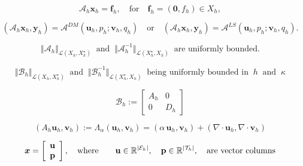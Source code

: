 \documentclass[11pt]{article}
\begin{document}
\begin{equation}\label{mixed-operator}
 \mathcal{A}_h {\bm x}_h = {\bm f}_h, \quad \mbox{for} \quad
{\bm f}_h =({\bm 0}, f_h) \in X_h,
\end{equation}

$$
( \mathcal{A}_h {\bm x}_h, {\bm y}_h) = {{\mathcal A}}^{DM}({{\mathbf u}}_h,p_h; {{\mathbf v}}_h,q_h)
\quad
\mbox{or} \quad
 ( \mathcal{A}_h {\bm x}_h, {\bm y}_h) = {{\mathcal A}}^{LS}({{\mathbf u}}_h,p_h; {{\mathbf v}}_h,q_h).
$$

\begin{equation}\label{eq:operator_norms}
 \Vert\mathcal{A}_h\Vert_{\mathcal{L}(X_h,X_h^{\star})}\;\; \mbox{and}\;\; 
\Vert\mathcal{A}_h^{-1}\Vert_{\mathcal{L}(X_h^{\star},X_h)} \;\; \mbox{are uniformly bounded}. 
\end{equation}

\begin{equation}\label{eq:precond_norms}
 \Vert\mathcal{B}_h\Vert_{\mathcal{L}(X_h,X_h^{\star})}\;\; \mbox{and}\;\; 
\Vert\mathcal{B}_h^{-1}\Vert_{\mathcal{L}(X_h^{\star},X_h)} \;\; \mbox{being uniformly bounded in} \;\; h \;\; \mbox{and} 
\;\; \kappa
\end{equation}

\begin{equation}\label{eq:AFW_preconditioner}
 \mathcal{B}_h:=\left[
\begin{array}{cc}
 A_h & 0\\[2ex]
 0 & D_h
\end{array}
\right]
\end{equation}

$$
(A_h{{\mathbf u}}_h,{{\mathbf v}}_h):=\Lambda_{{\alpha}}({{\mathbf u}}_h,{{\mathbf v}}_h)=
({{\alpha}} \, {{\mathbf u}}_h,{{\mathbf v}}_h)+(\nabla\cdot {{\mathbf u}}_h,\nabla\cdot {{\mathbf v}}_h)
$$

$$
{\bm x}=\left[
\begin{array}{c}
 {\bf u} \\
 {\bf p}
\end{array} \right ],
\quad \mbox{where} \quad
\quad {\bf u} \in \mathbb{R}^{|\mathcal{E}_h|},
\quad {\bf p} \in \mathbb{R}^{|\mathcal{T}_h|},
\quad \mbox{are vector columns} 
$$
\end{document}
